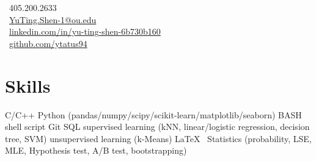 \documentclass[letterpaper]{deedy-resume-openfont}
\begin{document}
%
%
\lastupdated

%
%

{
    \faPhone \ 405.200.2633\\
    \faEnvelope \ \href{mailto:YuTing.Shen-1@ou.edu}{YuTing.Shen-1@ou.edu}\\
    \faLinkedinSquare \ \href{https://www.linkedin.com/in/yu-ting-shen-6b730b160/}{linkedin.com/in/yu-ting-shen-6b730b160}\\
    \faGithub \ \href{https://github.com/ytatus94}{github.com/ytatus94}
}




\section{Skills}

\raggedright{
    C/C++
    \textbullet{}
    Python (pandas/numpy/scipy/scikit-learn/matplotlib/seaborn)
    \textbullet{}
    BASH shell script
    \textbullet{}
    Git
    \textbullet{}
    SQL
    \textbullet{}
    supervised learning (kNN, linear/logistic regression, decision tree, SVM)
    \textbullet{}
    unsupervised learning (k-Means)
    \textbullet{} 
    \LaTeX\
    \textbullet{}
    Statistics (probability, LSE, MLE, Hypothesis test, A/B test, bootstrapping)
}
\sectionsep

\end{document}
